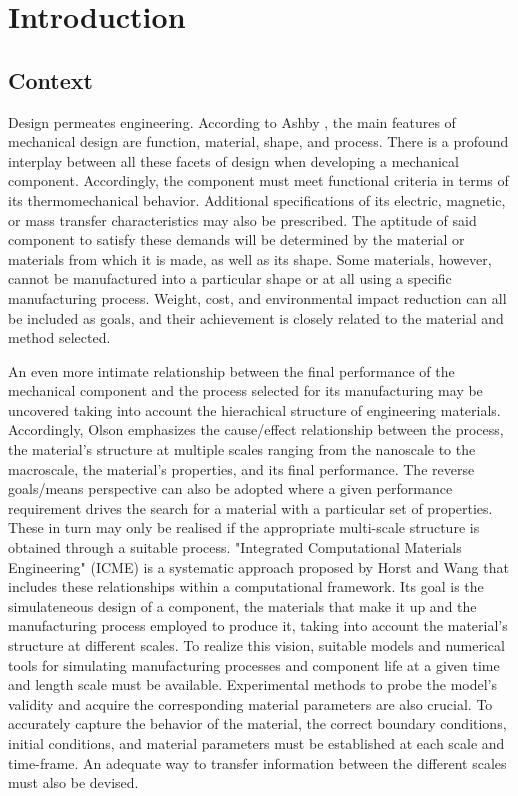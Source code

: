 \chapter{Introduction}

\section{Context}

Design permeates engineering.
According to Ashby \citep{ashbyMaterialsSelectionMechanical1999}, the main features of mechanical design are function, material, shape, and process.
There is a profound interplay between all these facets of design when developing a mechanical component.
Accordingly, the component must meet functional criteria in terms of its thermomechanical behavior.
Additional specifications of its electric, magnetic, or mass transfer characteristics may also be prescribed.
The aptitude of said component to satisfy these demands will be determined by the material or materials from which it is made, as well as its shape.
Some materials, however, cannot be manufactured into a particular shape or at all using a specific manufacturing process.
Weight, cost, and environmental impact reduction can all be included as goals, and their achievement is closely related to the material and method selected.

An even more intimate relationship between the final performance of the mechanical component and the process selected for its manufacturing may be uncovered taking into account the hierachical structure of engineering materials.
Accordingly, Olson \citep{olsonDesigningNewMaterial2000} emphasizes the cause/effect relationship between the process, the material's structure at multiple scales ranging from the nanoscale to the macroscale, the material's properties, and its final performance.
The reverse goals/means perspective can also be adopted where a given performance requirement drives the search for a material with a particular set of properties.
These in turn may only be realised if the appropriate multi-scale structure is obtained through a suitable process.
"Integrated Computational Materials Engineering" (ICME) is a systematic approach proposed by Horst and Wang \citep{horstemeyerCradletograveSimulationbasedDesign2003} that includes these relationships within a computational framework.
Its goal is the simulateneous design of a component, the materials that make it up and the manufacturing process employed to produce it, taking into account the material's structure at different scales.
To realize this vision, suitable models and numerical tools for simulating manufacturing processes and component life at a given time and length scale must be available.
Experimental methods to probe the model's validity and acquire the corresponding material parameters are also crucial.
To accurately capture the behavior of the material, the correct boundary conditions, initial conditions, and material parameters must be established at each scale and time-frame.
An adequate way to transfer information between the different scales must also be devised.

